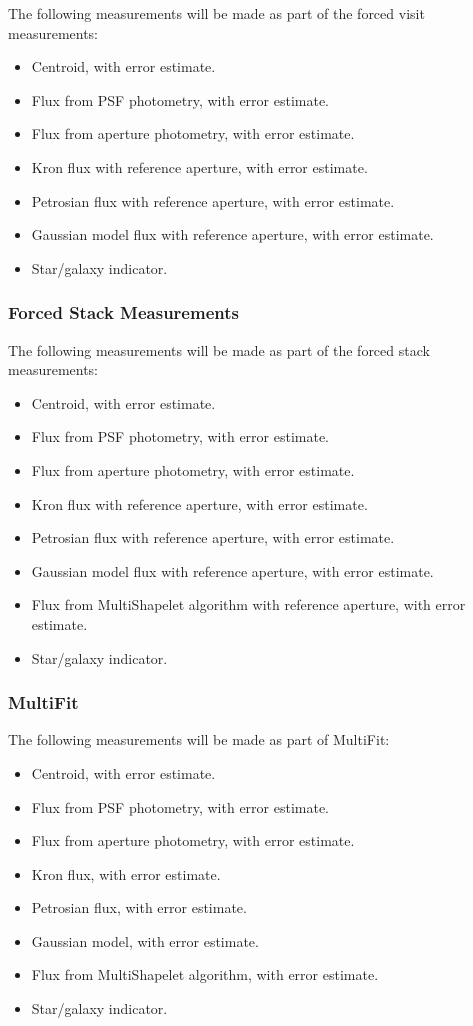 \documentclass[12pt]{article}
\begin{document}
The following measurements will be made as part of the forced visit measurements:
\begin{itemize}
\item Centroid, with error estimate.
\item Flux from PSF photometry, with error estimate.
\item Flux from aperture photometry, with error estimate.
\item Kron flux with reference aperture, with error estimate.
\item Petrosian flux with reference aperture, with error estimate.
\item Gaussian model flux with reference aperture, with error estimate.
\item Star/galaxy indicator.
\end{itemize}

\subsubsection{Forced Stack Measurements}

The following measurements will be made as part of the forced stack measurements:
\begin{itemize}
\item Centroid, with error estimate.
\item Flux from PSF photometry, with error estimate.
\item Flux from aperture photometry, with error estimate.
\item Kron flux with reference aperture, with error estimate.
\item Petrosian flux with reference aperture, with error estimate.
\item Gaussian model flux with reference aperture, with error estimate.
\item Flux from MultiShapelet algorithm with reference aperture, with error estimate.
\item Star/galaxy indicator.
\end{itemize}

\subsubsection{MultiFit}

The following measurements will be made as part of MultiFit:
\begin{itemize}
\item Centroid, with error estimate.
\item Flux from PSF photometry, with error estimate.
\item Flux from aperture photometry, with error estimate.
\item Kron flux, with error estimate.
\item Petrosian flux, with error estimate.
\item Gaussian model, with error estimate.
\item Flux from MultiShapelet algorithm, with error estimate.
\item Star/galaxy indicator.
\end{itemize}
\end{document}
